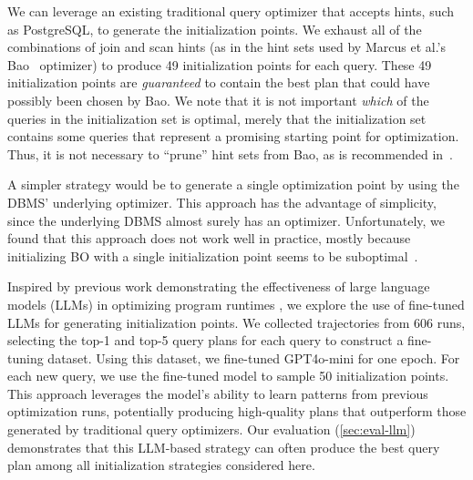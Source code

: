 
 We can leverage an existing traditional query optimizer that accepts hints, such as PostgreSQL, to generate the initialization points. We exhaust all of the combinations of join and scan hints (as in the hint sets used by Marcus et al.'s Bao~\cite{bao} optimizer) to produce 49 initialization points for each query. These 49 initialization points are \emph{guaranteed} to contain the best plan that could have possibly been chosen by Bao. We note that it is not important \emph{which} of the queries in the initialization set is optimal, merely that the initialization set contains some queries that represent a promising starting point for optimization. Thus, it is not necessary to ``prune'' hint sets from Bao, as is recommended in~\cite{bao}.

 A simpler strategy would be to generate a single optimization point by using the DBMS' underlying optimizer. This approach has the advantage of simplicity, since the underlying DBMS almost surely has an optimizer. Unfortunately, we found that this approach does not work well in practice, mostly because initializing BO with a single initialization point seems to be suboptimal~\cite{lolbo}.

 Inspired by previous work demonstrating the effectiveness of large language models (LLMs) in optimizing program runtimes \cite{pie}, we explore the use of fine-tuned LLMs for generating initialization points. We collected trajectories from 606 \sysname runs, selecting the top-1 and top-5 query plans for each query to construct a fine-tuning dataset. Using this dataset, we fine-tuned GPT4o-mini for one epoch. For each new query, we use the fine-tuned model to sample 50 initialization points. This approach leverages the model's ability to learn patterns from previous optimization runs, potentially producing high-quality plans that outperform those generated by traditional query optimizers. Our evaluation (\cref{sec:eval-llm}) demonstrates that this LLM-based strategy can often produce the best query plan among all initialization strategies considered here.

